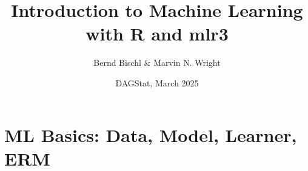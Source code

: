 \documentclass[13pt,compress]{beamer}
\title{Introduction to Machine Learning\\with R and mlr3}
\author{Bernd Bischl \& Marvin N. Wright}
\date{DAGStat, March 2025}
\begin{document}


\frame{\titlepage}

\section{ML Basics: Data, Model, Learner, ERM}


%
%
%
%
%
%


%
%


%
%
%
\end{document}
